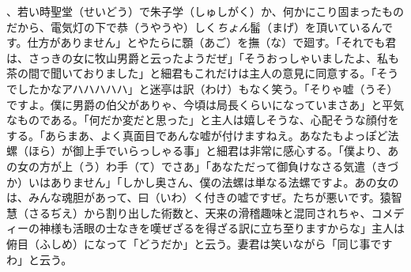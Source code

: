 \documentclass{book}
\begin{document}
、若い時聖堂（せいどう）で朱子学（しゅしがく）か、何かにこり固まったものだから、電気灯の下で恭（うやうや）しく\emph{ちょん}髷（まげ）を頂いているんです。仕方がありません」とやたらに顋（あご）を撫（な）で廻す。「それでも君は、さっきの女に牧山男爵と云ったようだぜ」「そうおっしゃいましたよ、私も茶の間で聞いておりました」と細君もこれだけは主人の意見に同意する。「そうでしたかなアハハハハハ」と迷亭は訳（わけ）もなく笑う。「そりゃ嘘（うそ）ですよ。僕に男爵の伯父がありゃ、今頃は局長くらいになっていまさあ」と平気なものである。「何だか変だと思った」と主人は嬉しそうな、心配そうな顔付をする。「あらまあ、よく真面目であんな嘘が付けますねえ。あなたもよっぽど法螺（ほら）が御上手でいらっしゃる事」と細君は非常に感心する。「僕より、あの女の方が上（う）わ手（て）でさあ」「あなただって御負けなさる気遣（きづか）いはありません」「しかし奥さん、僕の法螺は単なる法螺ですよ。あの女のは、みんな魂胆があって、曰（いわ）く付きの嘘ですぜ。たちが悪いです。猿智慧（さるぢえ）から割り出した術数と、天来の滑稽趣味と混同されちゃ、コメディーの神様も活眼の士なきを嘆ぜざるを得ざる訳に立ち至りますからな」主人は俯目（ふしめ）になって「どうだか」と云う。妻君は笑いながら「同じ事ですわ」と云う。
\end{document}
